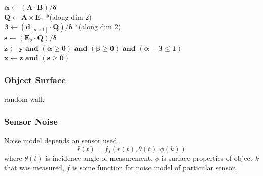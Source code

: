 \begin{algorithm}
{		
		$\bm{\alpha} \longleftarrow (\mathbf{A} \cdot \mathbf{B})/\bm{\delta}$ \label{line: alpha}\\
		$\mathbf{Q} \longleftarrow \mathbf{A} \times \mathbf{E}_1$ *(along dim 2)\\
		$\bm{\beta} \longleftarrow (\mathbf{d}_{[n \times 1]} \cdot \mathbf{Q})/\bm{\delta}$ *(along dim 2)\\
		$\mathbf{s} \longleftarrow (\mathbf{E}_2 \cdot \mathbf{Q})/\bm{\delta}$\\
		$\mathbf{z} \longleftarrow \mathbf{y} \textbf{ and } (\bm{\alpha} \geq \mathbf{0}) 
		\textbf{ and } (\bm{\beta} \geq \mathbf{0}) \textbf{ and } (\bm{\alpha}+\bm{\beta} \leq 
		\mathbf{1})$\\
		$\mathbf{x} \longleftarrow \mathbf{z} \textbf{ and } (\mathbf{s} \geq \mathbf{0})$ \label{line: intersectvec} \\
	}
	\caption{M{\"o}ller-Trumbore ray-triangle intersection} \label{intersectionalgorithm}
	\end{algorithm}
	
	\subsubsection{Object Surface}
	random walk
	
	\subsubsection{Sensor Noise}
	Noise model depends on sensor used.
	\begin{equation}
		\hat{r}(t) = f_s(r(t),\theta(t),\phi(k))
	\end{equation}
	where $\theta(t)$ is incidence angle of measurement, $\phi$ is surface properties of object $k$ that was measured, $f$ is some function for noise model of particular sensor.
	
